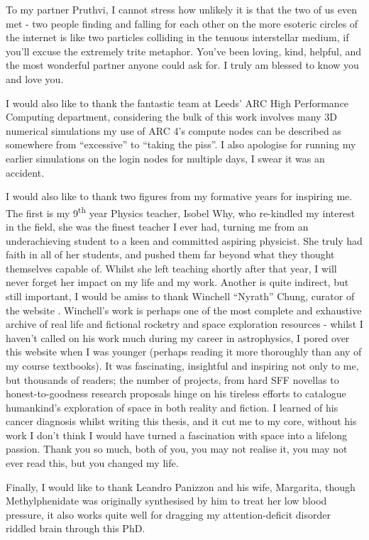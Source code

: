 \begin{acknowledgements}
To my partner Pruthvi, I cannot stress how unlikely it is that the two of us even met - two people finding and falling for each other on the more esoteric circles of the internet is like two particles colliding in the tenuous interstellar medium, if you'll excuse the extremely trite metaphor.
You've been loving, kind, helpful, and the most wonderful partner anyone could ask for.
I truly am blessed to know you and love you.

I would also like to thank the fantastic team at Leeds' ARC High Performance Computing department, considering the bulk of this work involves many 3D numerical simulations my use of ARC 4's compute nodes can be described as somewhere from ``excessive'' to ``taking the piss''.
I also apologise for running my earlier simulations on the login nodes for multiple days, I swear it was an accident.

I would also like to thank two figures from my formative years for inspiring me.
The first is my 9\textsuperscript{th} year Physics teacher, Isobel Why, who re-kindled my interest in the field, she was the finest teacher I ever had, turning me from an underachieving student to a keen and committed aspiring physicist.
She truly had faith in all of her students, and pushed them far beyond what they thought themselves capable of.
Whilst she left teaching shortly after that year, I will never forget her impact on my life and my work.
Another is quite indirect, but still important, I would be amiss to thank Winchell ``Nyrath'' Chung, curator of the website .
Winchell's work is perhaps one of the most complete and exhaustive archive of real life and fictional rocketry and space exploration resources - whilst I haven't called on his work much during my career in astrophysics, I pored over this website when I was younger (perhaps reading it more thoroughly than any of my course textbooks).
It was fascinating, insightful and inspiring not only to me, but thousands of readers; the number of projects, from hard SFF novellas to honest-to-goodness research proposals hinge on his tireless efforts to catalogue humankind's exploration of space in both reality and fiction.
I learned of his cancer diagnosis whilst writing this thesis, and it cut me to my core, without his work I don't think I would have turned a fascination with space into a lifelong passion.
Thank you so much, both of you, you may not realise it, you may not ever read this, but you changed my life.

Finally, I would like to thank Leandro Panizzon and his wife, Margarita, though Methylphenidate was originally synthesised by him to treat her low blood pressure, it also works quite well for dragging my attention-deficit disorder riddled brain through this PhD.

\end{acknowledgements}


